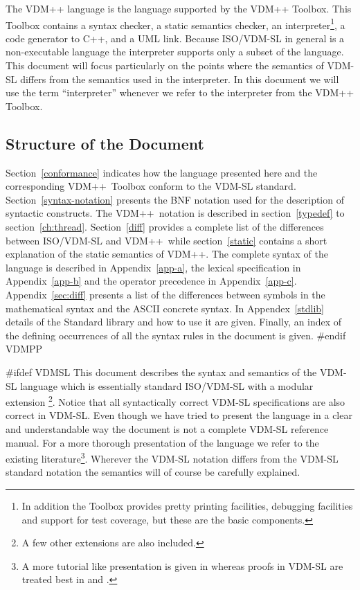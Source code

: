 \documentclass[\pformat,12pt]{article}
\newcommand{\vdmpp}{VDM++}
\begin{document}
The {\vdmpp} language is the language supported by the
{\vdmpp} Toolbox. This Toolbox contains a
syntax checker, a static semantics checker, an interpreter\footnote{In
addition the Toolbox provides pretty printing facilities, debugging
facilities and support for test coverage, but these are the basic
components.}, a code generator to C++, and a UML link.  Because
ISO/VDM-SL in general is a non-executable language the interpreter
supports only a subset of the language. This document will focus
particularly on the points where the semantics of VDM-SL differs from
the semantics used in the interpreter. In this document we will use
the term ``interpreter'' whenever we refer to the interpreter from the
{\vdmpp} Toolbox.

\subsection{Structure of the Document}

Section~\ref{conformance} indicates how the language presented here
and the corresponding \vdmpp\ Toolbox conform to the VDM-SL
standard.  Section~\ref{syntax-notation} presents the BNF notation
used for the description of syntactic constructs.  The \vdmpp\
notation is described in section~\ref{typedef} to
section~\ref{ch:thread}.  Section~\ref{diff} provides a complete list
of the differences between ISO/VDM-SL and \vdmpp\ while
section~\ref{static} contains a short explanation of the static
semantics of \vdmpp. The complete syntax of the language is described
in Appendix~\ref{app-a}, the lexical specification in
Appendix~\ref{app-b} and the operator precedence in
Appendix~\ref{app-c}. Appendix~\ref{sec:diff} presents a list of the
differences between symbols in the mathematical syntax and the ASCII
concrete syntax. In Appendex~\ref{stdlib} details of the Standard
library and how to use it are given. Finally, an index of the defining
occurrences of all 
the syntax rules in the document is given.
#endif VDMPP

#ifdef VDMSL
This document describes the syntax and semantics of the  VDM-SL
language which is essentially standard ISO/VDM-SL \cite{ISOVDM96}
with a modular extension
\footnote{A few other extensions are also included.}.
Notice that all syntactically correct VDM-SL specifications are also correct in
 VDM-SL. 
Even though we have tried to present the language in a
clear and understandable way the document is not a complete VDM-SL
reference manual. 
For a more thorough presentation of the language we refer to the
existing literature\footnote{A more tutorial like
presentation is given in \cite{Fitzgerald&98} whereas proofs in VDM-SL
are treated best in \cite{Jones90a} and \cite{Bicarregui&94}.}.
Wherever the  VDM-SL notation differs from
the VDM-SL standard notation the semantics will of course be carefully
explained.
\end{document}
